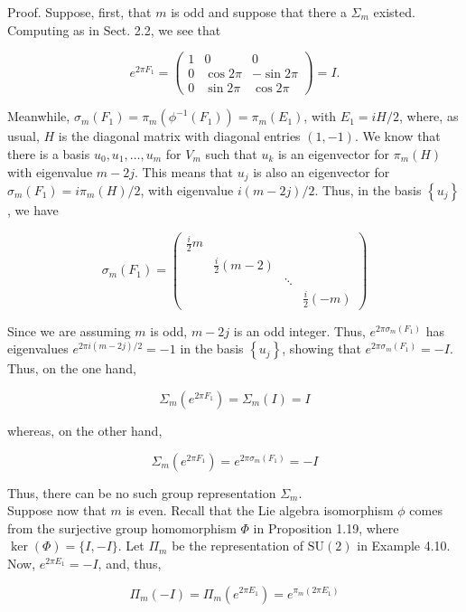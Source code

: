 \documentclass[10pt, letterpaper]{article}
\begin{document}
Proof. Suppose, first, that $m$ is odd and suppose that there a $\Sigma_{m}$ existed. Computing as in Sect. 2.2, we see that

$$
e^{2 \pi F_{1}}=\left(\begin{array}{rrr}
1 & 0 & 0 \\
0 & \cos 2 \pi & -\sin 2 \pi \\
0 & \sin 2 \pi & \cos 2 \pi
\end{array}\right)=I .
$$

Meanwhile, $\sigma_{m}\left(F_{1}\right)=\pi_{m}\left(\phi^{-1}\left(F_{1}\right)\right)=\pi_{m}\left(E_{1}\right)$, with $E_{1}=i H / 2$, where, as usual, $H$ is the diagonal matrix with diagonal entries $(1,-1)$. We know that there is a basis $u_{0}, u_{1}, \ldots, u_{m}$ for $V_{m}$ such that $u_{k}$ is an eigenvector for $\pi_{m}(H)$ with eigenvalue $m-2 j$. This means that $u_{j}$ is also an eigenvector for $\sigma_{m}\left(F_{1}\right)=i \pi_{m}(H) / 2$, with eigenvalue $i(m-2 j) / 2$. Thus, in the basis $\left\{u_{j}\right\}$, we have

$$
\sigma_{m}\left(F_{1}\right)=\left(\begin{array}{llll}
\frac{i}{2} m & & & \\
& \frac{i}{2}(m-2) & & \\
& & \ddots & \\
& & & \frac{i}{2}(-m)
\end{array}\right)
$$

Since we are assuming $m$ is odd, $m-2 j$ is an odd integer. Thus, $e^{2 \pi \sigma_{m}\left(F_{1}\right)}$ has eigenvalues $e^{2 \pi i(m-2 j) / 2}=-1$ in the basis $\left\{u_{j}\right\}$, showing that $e^{2 \pi \sigma_{m}\left(F_{1}\right)}=-I$. Thus, on the one hand,

$$
\Sigma_{m}\left(e^{2 \pi F_{1}}\right)=\Sigma_{m}(I)=I
$$

whereas, on the other hand,

$$
\Sigma_{m}\left(e^{2 \pi F_{1}}\right)=e^{2 \pi \sigma_{m}\left(F_{1}\right)}=-I
$$

Thus, there can be no such group representation $\Sigma_{m}$.\\
Suppose now that $m$ is even. Recall that the Lie algebra isomorphism $\phi$ comes from the surjective group homomorphism $\Phi$ in Proposition 1.19, where $\operatorname{ker}(\Phi)= \{I,-I\}$. Let $\Pi_{m}$ be the representation of $\mathrm{SU}(2)$ in Example 4.10. Now, $e^{2 \pi E_{1}}= -I$, and, thus,

$$
\Pi_{m}(-I)=\Pi_{m}\left(e^{2 \pi E_{1}}\right)=e^{\pi_{m}\left(2 \pi E_{1}\right)}
$$
\end{document}
